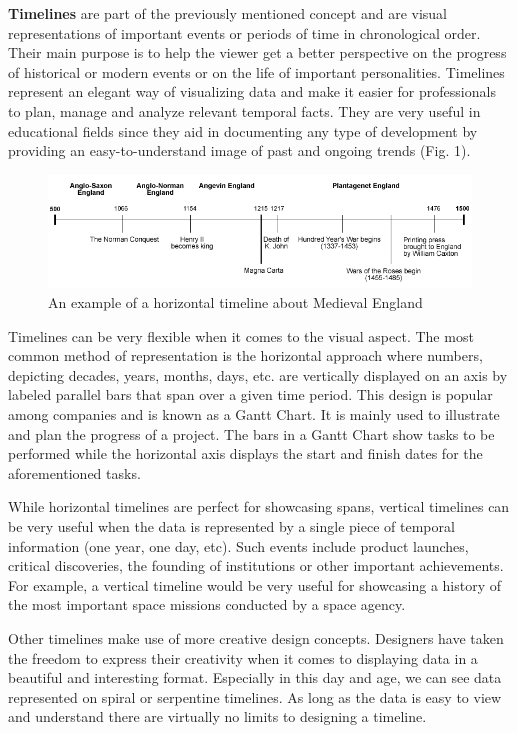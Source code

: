 \documentclass{report}
\begin{document}
\textbf{Timelines} are part of the previously mentioned concept and are visual representations of important events or periods of time in chronological order. Their main purpose is to help the viewer get a better perspective on the progress of historical or modern events or on the life of important personalities. Timelines represent an elegant way of visualizing data and make it easier for professionals to plan, manage and analyze relevant temporal facts. They are very useful in educational fields since they aid in documenting any type of development by providing an easy-to-understand image of past and ongoing trends (Fig. 1).\par

\begin{figure}[b]
\centerline{\includegraphics[scale=1.8]{media_timeline}}
\caption{An example of a horizontal timeline about Medieval England}
\end{figure}

Timelines can be very flexible when it comes to the visual aspect. The most common method of representation is the horizontal approach where numbers, depicting decades, years, months, days, etc. are vertically displayed on an axis by labeled parallel bars that span over a given time period. This design is popular among companies and is known as a Gantt Chart. It is mainly used to illustrate and plan the progress of a project. The bars in a Gantt Chart show tasks to be performed while the horizontal axis displays the start and finish dates for the aforementioned tasks.\par

While horizontal timelines are perfect for showcasing spans, vertical timelines can be very useful when the data is represented by a single piece of temporal information (one year, one day, etc). Such events include product launches, critical discoveries, the founding of institutions or other important achievements. For example, a vertical timeline would be very useful for showcasing a history of the most important space missions conducted by a space agency.\par

Other timelines make use of more creative design concepts. Designers have taken the freedom to express their creativity when it comes to displaying data in a beautiful and interesting format. Especially in this day and age,  we can see data represented on spiral or serpentine timelines. As long as the data is easy to view and understand there are virtually no limits to designing a timeline.\par 
\end{document}
